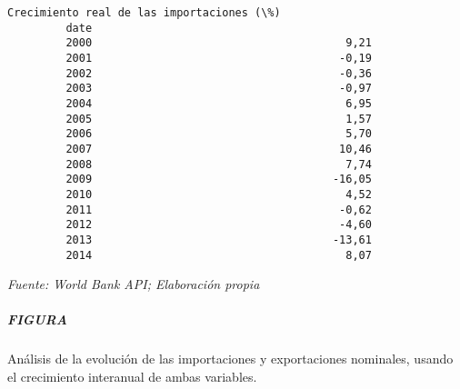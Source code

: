 \documentclass[11pt]{article}
\begin{document}
\begin{Verbatim}[commandchars=\\\{\}]
               Crecimiento real de las importaciones (\%)  
         date                                             
         2000                                       9,21  
         2001                                      -0,19  
         2002                                      -0,36  
         2003                                      -0,97  
         2004                                       6,95  
         2005                                       1,57  
         2006                                       5,70  
         2007                                      10,46  
         2008                                       7,74  
         2009                                     -16,05  
         2010                                       4,52  
         2011                                      -0,62  
         2012                                      -4,60  
         2013                                     -13,61  
         2014                                       8,07  
\end{Verbatim}
        
    \emph{Fuente: World Bank API; Elaboración propia}

    \subparagraph{FIGURA}\label{figura}

Análisis de la evolución de las importaciones y exportaciones nominales,
usando el crecimiento interanual de ambas variables.
\end{document}
